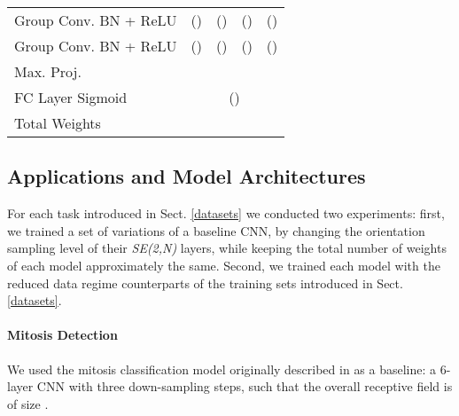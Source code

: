 \documentclass[twocolumn,final]{article}
\newcommand{\se}[1]{\textit{SE(#1)}}
\newcommand{\cellFormat}{\scriptsize \fontsize{7pt}{0pt}}
\newlength{\cellWidth}   \setlength{\cellWidth}{0.14\columnwidth}
\begin{document}
\begin{table}[ht!]
\begin{tabular}{p{} || p{\cellWidth}  p{\cellWidth} p{\cellWidth} p{\cellWidth}}
 \scriptsize \centering Group Conv. \newline BN + ReLU
& \cellFormat   \newline ()
& \cellFormat  \newline ()
& \cellFormat    \newline ()
& \cellFormat   \newline ()
\\

\scriptsize \centering Group Conv. \newline BN + ReLU
& \cellFormat   \newline ()
& \cellFormat   \newline ()
& \cellFormat   \newline ()
& \cellFormat  \newline ()
\\

\scriptsize \centering Max. Proj.
& \multicolumn{4}{c}{ \cellFormat  }
\\

\scriptsize \centering FC Layer \newline Sigmoid 
& \multicolumn{4}{c}{ \cellFormat  () }
\\\hline

\scriptsize \centering Total \newline Weights
& \multicolumn{1}{c}{ \scriptsize }
& \multicolumn{1}{c}{ \scriptsize  }
& \multicolumn{1}{c}{ \scriptsize  }
& \multicolumn{1}{c}{ \scriptsize  }

\end{tabular}
\label{tab:mitosisArchitecture} 
\end{table}


\subsection{Applications and Model Architectures}
\label{sec:expApplicationsAndTraining}
For each task introduced in Sect. \ref{datasets} we conducted two experiments:
first, we trained a set of variations of a baseline CNN, by changing the orientation sampling level  of their \se{2,N} layers, while keeping the total number of weights of each model approximately the same.
Second, we trained each model with the reduced data regime counterparts of the training sets introduced in Sect. \ref{datasets}.


\paragraph{Mitosis Detection}
We used the mitosis classification model originally described in \cite{bekkers2018roto} as a baseline: a 6-layer CNN with three down-sampling steps, such that the overall receptive field is of size .
\end{document}
